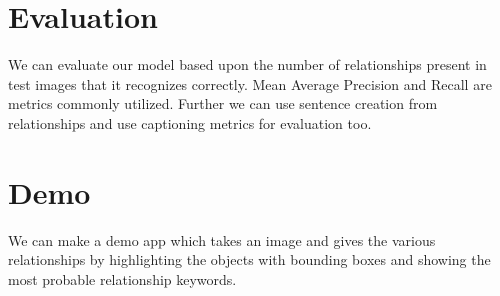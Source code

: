 \documentclass[10pt,a4paper]{article}
\begin{document}
\section{Evaluation}
We can evaluate our model based upon the number of relationships present in test images that it recognizes correctly. Mean Average Precision and Recall are metrics commonly utilized. Further we can use sentence creation from relationships and use captioning  metrics for evaluation too.

\section{Demo}
We can make a demo app which takes an image and gives the various relationships by highlighting the objects with bounding boxes and showing the most probable relationship keywords.
\end{document}
